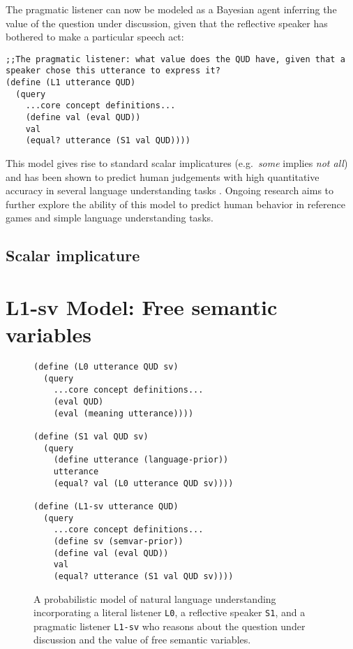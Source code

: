 \documentclass[12pt]{article}
\newcounter{definition}
\begin{document}
The pragmatic listener can now be modeled as a Bayesian agent inferring the value of the question under discussion, given that the reflective speaker has bothered to make a particular speech act:
\begin{lstlisting}
;;The pragmatic listener: what value does the QUD have, given that a speaker chose this utterance to express it?    
(define (L1 utterance QUD)
  (query
    ...core concept definitions...
    (define val (eval QUD))
    val
    (equal? utterance (S1 val QUD))))
\end{lstlisting}
This model gives rise to standard scalar implicatures (e.g.~\emph{some} implies \emph{not all}) and has been shown to predict human judgements with high quantitative accuracy in several language understanding tasks \cite{Frank2012,Goodman2013}. Ongoing research aims to further explore the ability of this model to predict human behavior in reference games and simple language understanding tasks.

\subsection{Scalar implicature}



 
\section{L1-sv Model: Free semantic variables}


\begin{figure}[tbhp]
\begin{center}
\begin{minipage}{0.7\linewidth}
\begin{lstlisting}
(define (L0 utterance QUD sv)
  (query
    ...core concept definitions...
    (eval QUD)
    (eval (meaning utterance))))

(define (S1 val QUD sv)
  (query
    (define utterance (language-prior))
    utterance
    (equal? val (L0 utterance QUD sv))))

(define (L1-sv utterance QUD)
  (query
    ...core concept definitions...
    (define sv (semvar-prior))
    (define val (eval QUD))
    val
    (equal? utterance (S1 val QUD sv))))
\end{lstlisting}
\end{minipage}
\caption{A probabilistic model of natural language understanding incorporating a literal listener \lstinline{L0}, a reflective speaker \lstinline{S1}, and a pragmatic listener \lstinline{L1-sv} who reasons about the question under discussion and the value of free semantic variables.}
\label{L1-sv}
\end{center}
\end{figure}
\end{document}
